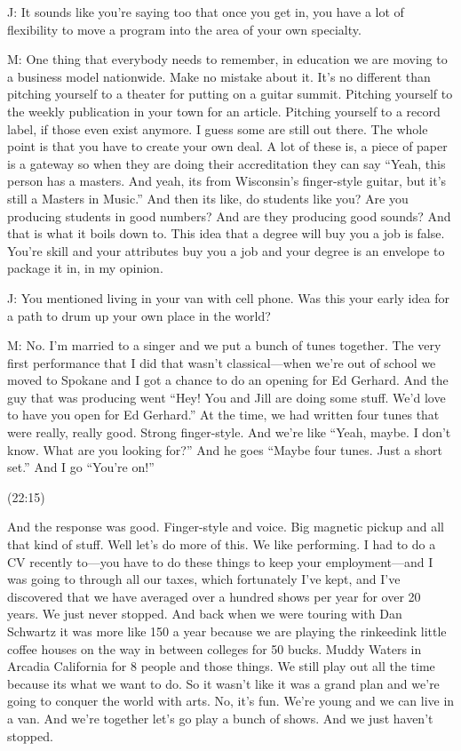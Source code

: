 \documentclass[11pt]{article}
\begin{document}
J: It sounds like you're saying too that once you get in, you have a lot of flexibility to move a program into the area of your own specialty. 

M: One thing that everybody needs to remember, in education we are moving to a business model nationwide. Make no mistake about it. It's no different than pitching yourself to a theater for putting on a guitar summit. Pitching yourself to the weekly publication in your town for an article. Pitching yourself to a record label, if those even exist anymore. I guess some are still out there. The whole point is that you have to create your own deal. A lot of these is, a piece of paper is a gateway so when they are doing their accreditation they can say ``Yeah, this person has a masters. And yeah, its from Wisconsin's finger-style guitar, but it's still a Masters in Music.'' And then its like, do students like you? Are you producing students in good numbers? And are they producing good sounds? And that is what it boils down to. This idea that a degree will buy you a job is false. You're skill and your attributes buy you a job and your degree is an envelope to package it in, in my opinion. 

J: You mentioned living in your van with cell phone. Was this your early idea for a path to drum up your own place in the world?

M: No. I'm married to a singer and we put a bunch of tunes together. The very first performance that I did that wasn't classical—when we're out of school we moved to Spokane and I got a chance to do an opening for Ed Gerhard. And the guy that was producing went ``Hey! You and Jill are doing some stuff. We'd love to have you open for Ed Gerhard.'' At the time, we had written four tunes that were really, really good. Strong finger-style. And we're like ``Yeah, maybe. I don't know. What are you looking for?'' And he goes ``Maybe four tunes. Just a short set.'' And I go ``You're on!'' 

(22:15)

And the response was good. Finger-style and voice. Big magnetic pickup and all that kind of stuff. Well let's do more of this. We like performing. I had to do a CV recently to—you have to do these things to keep your employment—and I was going to through all our taxes, which fortunately I've kept, and I've discovered that we have averaged over a hundred shows per year for over 20 years. We just never stopped. And back when we were touring with Dan Schwartz it was more like 150 a year because we are playing the rinkeedink little coffee houses on the way in between colleges for 50 bucks. Muddy Waters in Arcadia California for 8 people and those things. We still play out all the time because its what we want to do. So it wasn't like it was a grand plan and we're going to conquer the world with arts. No, it's fun. We're young and we can live in a van. And we're together let's go play a bunch of shows. And we just haven't stopped.
\end{document}
